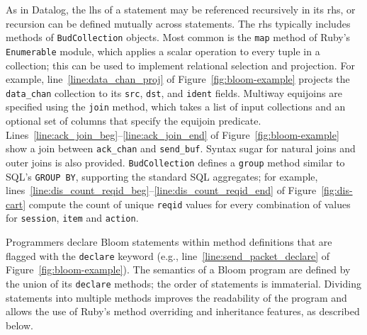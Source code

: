As in Datalog, the lhs of a statement may be referenced recursively in its rhs,
or recursion can be defined mutually across statements.  The rhs typically
includes methods of \texttt{BudCollection} objects.  Most common is the
\texttt{map} method of Ruby's \texttt{Enumerable} module, which applies a scalar
operation to every tuple in a collection; this can be used to implement
relational selection and projection. For example, line~\ref{line:data_chan_proj}
of Figure~\ref{fig:bloom-example} projects the \texttt{data\_chan} collection to
its \texttt{src}, \texttt{dst}, and \texttt{ident} fields.  Multiway equijoins
are specified using the \texttt{join} method, which takes a list of input
collections and an optional set of columns that specify the equijoin predicate.
Lines~\ref{line:ack_join_beg}--\ref{line:ack_join_end} of
Figure~\ref{fig:bloom-example} show a join between \texttt{ack\_chan} and
\texttt{send\_buf}. Syntax sugar for natural joins and outer joins is also
provided. \texttt{BudCollection} defines a \texttt{group} method similar to
SQL's \texttt{GROUP BY}, supporting the standard SQL aggregates; for example,
lines~\ref{line:dis_count_reqid_beg}--\ref{line:dis_count_reqid_end} of
Figure~\ref{fig:dis-cart} compute the count of unique \texttt{reqid} values for
every combination of values for \texttt{session}, \texttt{item} and
\texttt{action}.


Programmers declare Bloom statements within method definitions that are flagged
with the \texttt{declare} keyword (e.g., line~\ref{line:send_packet_declare} of
Figure~\ref{fig:bloom-example}). The semantics of a Bloom program are defined by
the union of its \texttt{declare} methods; the order of statements is
immaterial. Dividing statements into multiple methods improves the readability
of the program and allows the use of Ruby's method overriding and inheritance
features, as described below.


